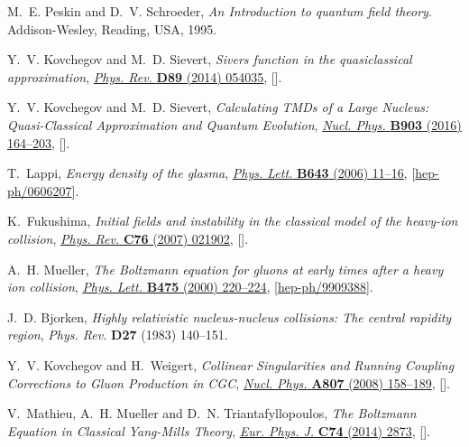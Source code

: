 \documentclass[onecolumn,showpacs,nobibnotes,nofootinbib,12pt,aps,prd,showpacs,notitlepage,nofootinbib,preprintnumbers,amsmath,amssymb]{article}
\begin{document}
\begin{thebibliography}{10}
M.~E. Peskin and D.~V. Schroeder, \emph{An Introduction to quantum field
  theory}.
\newblock Addison-Wesley, Reading, USA, 1995.

Y.~V. Kovchegov and M.~D. Sievert, \emph{{Sivers function in the quasiclassical
  approximation}},
  \href{https://doi.org/10.1103/PhysRevD.89.054035}{\emph{Phys. Rev.}
  {\bfseries D89} (2014) 054035},
  [\href{https://arxiv.org/abs/1310.5028}{{}}].

Y.~V. Kovchegov and M.~D. Sievert, \emph{{Calculating TMDs of a Large Nucleus:
  Quasi-Classical Approximation and Quantum Evolution}},
  \href{https://doi.org/10.1016/j.nuclphysb.2015.12.008}{\emph{Nucl. Phys.}
  {\bfseries B903} (2016) 164--203},
  [\href{https://arxiv.org/abs/1505.01176}{{}}].

T.~Lappi, \emph{{Energy density of the glasma}},
  \href{https://doi.org/10.1016/j.physletb.2006.10.017}{\emph{Phys. Lett.}
  {\bfseries B643} (2006) 11--16},
  [\href{https://arxiv.org/abs/hep-ph/0606207}{{\ttfamily hep-ph/0606207}}].

K.~Fukushima, \emph{{Initial fields and instability in the classical model of
  the heavy-ion collision}},
  \href{https://doi.org/10.1103/PhysRevC.76.021902}{\emph{Phys. Rev.}
  {\bfseries C76} (2007) 021902},
  [\href{https://arxiv.org/abs/0704.3625}{{}}].

A.~H. Mueller, \emph{{The Boltzmann equation for gluons at early times after a
  heavy ion collision}},
  \href{https://doi.org/10.1016/S0370-2693(00)00084-8}{\emph{Phys. Lett.}
  {\bfseries B475} (2000) 220--224},
  [\href{https://arxiv.org/abs/hep-ph/9909388}{{\ttfamily hep-ph/9909388}}].

J.~D. Bjorken, \emph{Highly relativistic nucleus-nucleus collisions: The
  central rapidity region}, {\emph{Phys. Rev.} {\bfseries D27} (1983)
  140--151}.

Y.~V. Kovchegov and H.~Weigert, \emph{{Collinear Singularities and Running
  Coupling Corrections to Gluon Production in CGC}},
  \href{https://doi.org/10.1016/j.nuclphysa.2008.04.008}{\emph{Nucl. Phys.}
  {\bfseries A807} (2008) 158--189},
  [\href{https://arxiv.org/abs/0712.3732}{{}}].

V.~Mathieu, A.~H. Mueller and D.~N. Triantafyllopoulos, \emph{{The Boltzmann
  Equation in Classical Yang-Mills Theory}},
  \href{https://doi.org/10.1140/epjc/s10052-014-2873-8}{\emph{Eur. Phys. J.}
  {\bfseries C74} (2014) 2873},
  [\href{https://arxiv.org/abs/1403.1184}{{}}].


\end{thebibliography}
\end{document}
